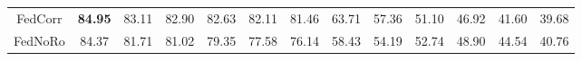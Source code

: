 \begin{table}[t]
\begin{center}
{\begin{tabular}{c|cccccccccccc}
FedCorr & \multicolumn{1}{c}{\textbf{84.95}} & \multicolumn{1}{c}{83.11} & \multicolumn{1}{c}{82.90} & \multicolumn{1}{c}{82.63} & \multicolumn{1}{c}{82.11} & \multicolumn{1}{c}{81.46} & \multicolumn{1}{c}{63.71} & \multicolumn{1}{c}{57.36} & \multicolumn{1}{c}{51.10} & \multicolumn{1}{c}{46.92} & \multicolumn{1}{c}{41.60} & \multicolumn{1}{c}{39.68} \\ 
FedNoRo & \multicolumn{1}{c}{84.37} & \multicolumn{1}{c}{81.71} & \multicolumn{1}{c}{81.02} & \multicolumn{1}{c}{79.35} & \multicolumn{1}{c}{77.58} & \multicolumn{1}{c}{76.14} & \multicolumn{1}{c}{58.43} & \multicolumn{1}{c}{54.19} & \multicolumn{1}{c}{52.74} & \multicolumn{1}{c}{48.90} & \multicolumn{1}{c}{44.54} & \multicolumn{1}{c}{40.76} \\ \hline
\end{tabular}
}
\label{table:compare cifar10}
\end{center}
\end{table}
